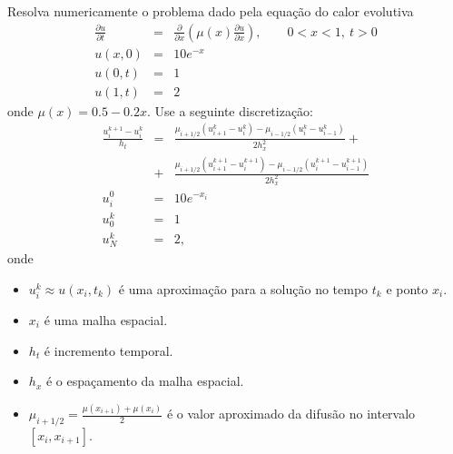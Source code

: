 \begin{exer}
Resolva numericamente o problema dado pela equação do calor evolutiva
\begin{eqnarray*}
\frac{\partial u}{\partial t}&=&\frac{\partial}{\partial x}\left(\mu(x)\frac{\partial u}{\partial x}\right),\qquad 0<x<1,\ t>0\\
u(x,0)&=&10e^{-x}\\
u(0,t)&=&1\\
u(1,t)&=&2
\end{eqnarray*}
onde $\mu(x)=0.5 - 0.2x$. Use a seguinte discretização:
\begin{eqnarray*}
\frac{u^{k+1}_i-u^{k}_i}{h_t}&=&\frac{\mu_{i+1/2}\left(u^{k}_{i+1}-u^{k}_i\right)-\mu_{i-1/2}\left(u^{k}_{i}-u^{k}_{i-1}\right)}{2h_x^2}+\\
&+&\frac{\mu_{i+1/2}\left(u^{k+1}_{i+1}-u^{k+1}_i\right)-\mu_{i-1/2}\left(u^{k+1}_{i}-u^{k+1}_{i-1}\right)}{2h_x^2}\\
u_i^0&=&10e^{-x_i}\\
u_0^{k}&=&1\\
u_N^{k}&=&2,
\end{eqnarray*}
onde
\begin{itemize}
 \item $u^k_i\approx u(x_i,t_k)$ é uma aproximação para a solução no tempo $t_k$ e ponto $x_i$.
 \item $x_i$ é uma malha espacial.
 \item $h_t$ é incremento temporal.
 \item $h_x$ é o espaçamento da malha espacial.
 \item $\mu_{i+1/2}=\frac{\mu(x_{i+1})+\mu(x_i)}{2}$ é o valor aproximado da difusão no intervalo $[x_i,x_{i+1}]$.
\end{itemize}
\end{exer}
